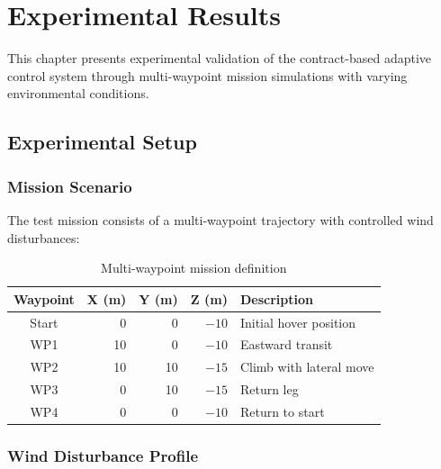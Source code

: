 
\chapter{Experimental Results}
\label{ch:results}

This chapter presents experimental validation of the contract-based adaptive control system through multi-waypoint mission simulations with varying environmental conditions.

\section{Experimental Setup}

\subsection{Mission Scenario}

The test mission consists of a multi-waypoint trajectory with controlled wind disturbances:

\begin{table}[htbp]
    \centering
    \caption{Multi-waypoint mission definition}
    \label{tab:mission_waypoints}
    \begin{tabular}{@{}crrrl@{}}
        \toprule
        \textbf{Waypoint} & \textbf{X (m)} & \textbf{Y (m)} & \textbf{Z (m)} & \textbf{Description} \\
        \midrule
        Start & 0 & 0 & $-10$ & Initial hover position \\
        WP1 & 10 & 0 & $-10$ & Eastward transit \\
        WP2 & 10 & 10 & $-15$ & Climb with lateral move \\
        WP3 & 0 & 10 & $-15$ & Return leg \\
        WP4 & 0 & 0 & $-10$ & Return to start \\
        \bottomrule
    \end{tabular}
\end{table}

\subsection{Wind Disturbance Profile}

